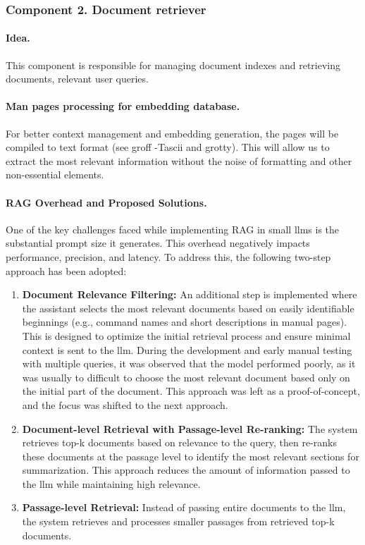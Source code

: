 \subsubsection{Component 2. Document retriever}

\paragraph{Idea.}{}
This component is responsible for managing document indexes and retrieving documents, relevant user queries.

\paragraph{Man pages processing for embedding database.}{}
For better context management and embedding generation, the pages will be
compiled to text format (see groff -Tascii and grotty). This will allow us to
extract the most relevant information without the noise of formatting and other
non-essential elements.

\paragraph{RAG Overhead and Proposed Solutions.}{}
One of the key challenges faced while implementing RAG in small \glspl{llm}
is the substantial prompt size it generates. This overhead negatively
impacts performance, precision, and latency. To address this, the
following two-step approach has been adopted:

\begin{enumerate}
  \item \textbf{Document Relevance Filtering:} An additional step is
    implemented where the assistant selects the most relevant
    documents based on easily identifiable beginnings (e.g., command
    names and short descriptions in manual pages). This is designed
    to optimize the initial retrieval process and ensure minimal
    context is sent to the \gls{llm}.
    During the development and early manual testing with multiple queries, it
    was observed that the model performed poorly, as it was usually to
    difficult to choose the most relevant document based only on the initial
    part of the document. This approach was left as a proof-of-concept, and
    the focus was shifted to the next approach.
  \item \textbf{Document-level Retrieval with Passage-level Re-ranking:} The
    system retrieves top-k documents based on relevance to the query, then
    re-ranks these documents at the passage level to identify the most
    relevant sections for summarization. This approach reduces the amount of
    information passed to the \gls{llm} while maintaining high relevance.
  \item \textbf{Passage-level Retrieval:} Instead of passing entire documents to
    the \gls{llm}, the system retrieves and processes smaller passages from
    retrieved top-k documents.
\end{enumerate}


